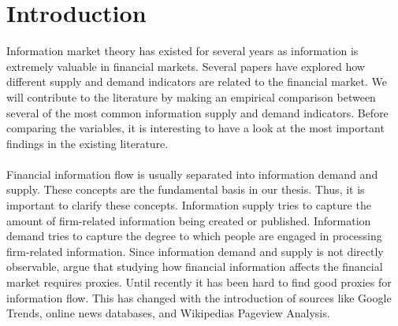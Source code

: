 
\chapter{Introduction}\label{sec:introduction}
Information market theory has existed for several years as information is extremely valuable in financial markets. Several papers have explored how different supply and demand indicators are related to the financial market. We will contribute to the literature by making an empirical comparison between several of the most common information supply and demand indicators. Before comparing the variables, it is interesting to have a look at the most important findings in the existing literature. 
\\\\
Financial information flow is usually separated into information demand and supply. These concepts are the fundamental basis in our thesis. Thus, it is important to clarify these concepts. Information supply tries to capture the amount of firm-related information being created or published. Information demand tries to capture the degree to which people are engaged in processing firm-related information. Since information demand and supply is not directly observable, \cite{vlastakis} argue that studying how financial information affects the financial market requires proxies. Until recently it has been hard to find good proxies for information flow. This has changed with the introduction of sources like Google Trends, online news databases, and Wikipedias Pageview Analysis.  
\\\\
